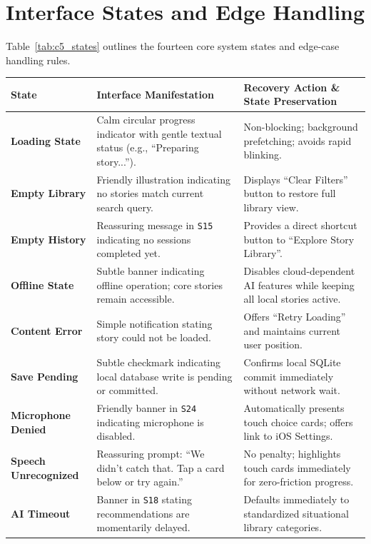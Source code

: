 \section{Interface States and Edge Handling}

Table~\ref{tab:c5_states} outlines the fourteen core system states and edge-case handling rules.

\begin{xltabular}{\textwidth}{|p{3.2cm}|p{4.5cm}|X|}
\hline
\textbf{State} & \textbf{Interface Manifestation} & \textbf{Recovery Action \& State Preservation} \\ \hline
\endhead
\textbf{Loading State} & Calm circular progress indicator with gentle textual status (e.g., ``Preparing story...''). & Non-blocking; background prefetching; avoids rapid blinking. \\ \hline
\textbf{Empty Library} & Friendly illustration indicating no stories match current search query. & Displays ``Clear Filters'' button to restore full library view. \\ \hline
\textbf{Empty History} & Reassuring message in \texttt{S15} indicating no sessions completed yet. & Provides a direct shortcut button to ``Explore Story Library''. \\ \hline
\textbf{Offline State} & Subtle banner indicating offline operation; core stories remain accessible. & Disables cloud-dependent AI features while keeping all local stories active. \\ \hline
\textbf{Content Error} & Simple notification stating story could not be loaded. & Offers ``Retry Loading'' and maintains current user position. \\ \hline
\textbf{Save Pending} & Subtle checkmark indicating local database write is pending or committed. & Confirms local SQLite commit immediately without network wait. \\ \hline
\textbf{Microphone Denied} & Friendly banner in \texttt{S24} indicating microphone is disabled. & Automatically presents touch choice cards; offers link to iOS Settings. \\ \hline
\textbf{Speech Unrecognized} & Reassuring prompt: ``We didn't catch that. Tap a card below or try again.'' & No penalty; highlights touch cards immediately for zero-friction progress. \\ \hline
\textbf{AI Timeout} & Banner in \texttt{S18} stating recommendations are momentarily delayed. & Defaults immediately to standardized situational library categories. \\ \hline

\end{xltabular}

